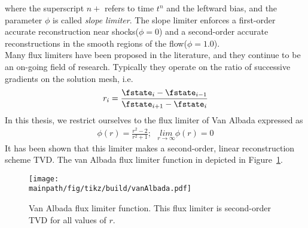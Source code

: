 \documentclass[../main.tex]{subfiles}
\begin{document}
where the superscript $n+$ refers to time $t^n$ and the leftward bias, and the parameter $\phi$ is called \textit{slope limiter}. The slope limiter enforces a first-order accurate reconstruction near shocks($\phi=0$) and a second-order accurate reconstructions in the smooth regions of the flow($\phi=1.0$).\\
Many flux limiters have been proposed in the literature, and they continue to be an on-going field of research. Typically they operate on the ratio of successive gradients on the solution mesh, i.e.
\begin{align}
r_i=\frac{\fstate_i-\fstate_{i-1}}{\fstate_{i+1}-\fstate_i}
\end{align}
In this thesis, we restrict ourselves to the flux limiter of Van Albada\cite{VanAlbada1982} expressed as
\begin{align}\label{eq:vanalbada}
\phi(r)=\frac{r^2-2}{r^2+1};~~~\underset{r\rightarrow\infty}{lim} \phi(r)=0
\end{align}
It has been shown that this limiter makes a second-order, linear reconstruction scheme \ac{TVD}. The van Albada flux limiter function in depicted in Figure~\ref{fig:vanAlbada}.

\begin{figure}
\centering
\texttt{[image: \\mainpath/fig/tikz/build/vanAlbada.pdf]}
\caption[Van Albada flux limiter function]{Van Albada flux limiter function. This flux limiter is second-order \ac{TVD} for all values of $r$.}
\label{fig:vanAlbada}
\end{figure}





\end{document}
